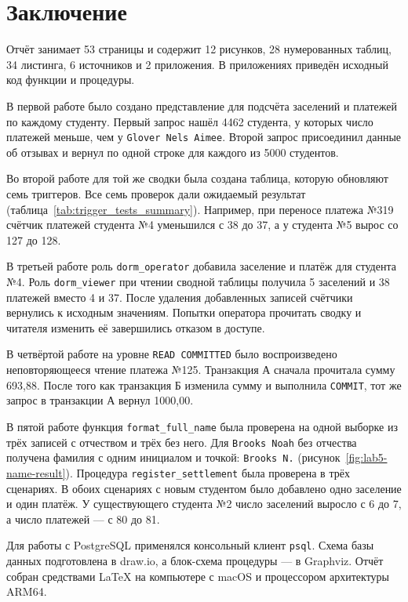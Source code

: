 %
\section*{Заключение}

Отчёт занимает 53 страницы и содержит 12 рисунков, 28 нумерованных таблиц, 34 листинга, 6 источников и 2 приложения. В приложениях приведён исходный код функции и процедуры.

В первой работе было создано представление для подсчёта заселений и платежей по каждому студенту. Первый запрос нашёл 4462 студента, у которых число платежей меньше, чем у \texttt{Glover Nels Aimee}. Второй запрос присоединил данные об отзывах и вернул по одной строке для каждого из 5000 студентов.

Во второй работе для той же сводки была создана таблица, которую обновляют семь триггеров. Все семь проверок дали ожидаемый результат (таблица~\ref{tab:trigger_tests_summary}). Например, при переносе платежа №319 счётчик платежей студента №4 уменьшился с 38 до 37, а у студента №5 вырос со 127 до 128.

В третьей работе роль \texttt{dorm\_operator} добавила заселение и платёж для студента №4. Роль \texttt{dorm\_viewer} при чтении сводной таблицы получила 5 заселений и 38 платежей вместо 4 и 37. После удаления добавленных записей счётчики вернулись к исходным значениям. Попытки оператора прочитать сводку и читателя изменить её завершились отказом в доступе.

В четвёртой работе на уровне \texttt{READ COMMITTED} было воспроизведено неповторяющееся чтение платежа №125. Транзакция А сначала прочитала сумму 693,88. После того как транзакция Б изменила сумму и выполнила \texttt{COMMIT}, тот же запрос в транзакции А вернул 1000,00.

В пятой работе функция \texttt{format\_full\_name} была проверена на одной выборке из трёх записей с отчеством и трёх без него. Для \texttt{Brooks Noah} без отчества получена фамилия с одним инициалом и точкой: \texttt{Brooks N.} (рисунок~\ref{fig:lab5-name-result}). Процедура \texttt{register\_settlement} была проверена в трёх сценариях. В обоих сценариях с новым студентом было добавлено одно заселение и один платёж. У существующего студента №2 число заселений выросло с 6 до 7, а число платежей --- с 80 до 81.

Для работы с PostgreSQL применялся консольный клиент \texttt{psql}. Схема базы данных подготовлена в draw.io, а блок-схема процедуры --- в Graphviz. Отчёт собран средствами LaTeX на компьютере с macOS и процессором архитектуры ARM64.

